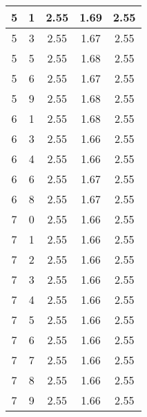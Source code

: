 \begin{longtable}{|c|c||c||c||c|}
	5 & 1 & 2.55 & 1.69 & 2.55 \\ \hline
	5 & 3 & 2.55 & 1.67 & 2.55 \\ \hline
	5 & 5 & 2.55 & 1.68 & 2.55 \\ \hline
	5 & 6 & 2.55 & 1.67 & 2.55 \\ \hline
	5 & 9 & 2.55 & 1.68 & 2.55 \\ \hline
	6 & 1 & 2.55 & 1.68 & 2.55 \\ \hline
	6 & 3 & 2.55 & 1.66 & 2.55 \\ \hline
	6 & 4 & 2.55 & 1.66 & 2.55 \\ \hline
	6 & 6 & 2.55 & 1.67 & 2.55 \\ \hline
	6 & 8 & 2.55 & 1.67 & 2.55 \\ \hline
	7 & 0 & 2.55 & 1.66 & 2.55 \\ \hline
	7 & 1 & 2.55 & 1.66 & 2.55 \\ \hline
	7 & 2 & 2.55 & 1.66 & 2.55 \\ \hline
	7 & 3 & 2.55 & 1.66 & 2.55 \\ \hline
	7 & 4 & 2.55 & 1.66 & 2.55 \\ \hline
	7 & 5 & 2.55 & 1.66 & 2.55 \\ \hline
	7 & 6 & 2.55 & 1.66 & 2.55 \\ \hline
	7 & 7 & 2.55 & 1.66 & 2.55 \\ \hline
	7 & 8 & 2.55 & 1.66 & 2.55 \\ \hline
	7 & 9 & 2.55 & 1.66 & 2.55 \\ \hline
\end{longtable}
\clearpage{}
